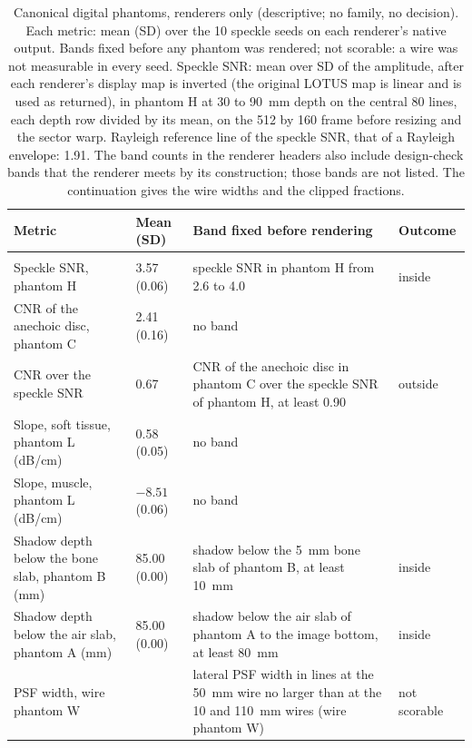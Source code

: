 
\begin{table}[tp]
\renewcommand{\baselinestretch}{1}\scriptsize
\caption{Canonical digital phantoms, renderers only (descriptive; no family, no decision). Each metric: mean (SD) over the 10 speckle seeds on each renderer's native output. Bands fixed before any phantom was rendered; not scorable: a wire was not measurable in every seed. Speckle SNR: mean over SD of the amplitude, after each renderer's display map is inverted (the original LOTUS map is linear and is used as returned), in phantom H at 30 to 90~mm depth on the central 80 lines, each depth row divided by its mean, on the 512 by 160 frame before resizing and the sector warp. Rayleigh reference line of the speckle SNR, that of a Rayleigh envelope: 1.91. The band counts in the renderer headers also include design-check bands that the renderer meets by its construction; those bands are not listed. The continuation gives the wire widths and the clipped fractions.}
\label{tab:phantoms}
\centering
\setlength{\tabcolsep}{3pt}
\begin{tabularx}{\textwidth}{@{}>{\raggedright\arraybackslash}p{} l >{\raggedright\arraybackslash}X l@{}}
\toprule
Metric & Mean (SD) & Band fixed before rendering & Outcome \\
\midrule
\multicolumn{4}{@{}l}{\textit{Physics renderer: meets 5 of 8 bands, 2 not scorable}} \\
\quad Speckle SNR, phantom H & 3.57 (0.06) & speckle SNR in phantom H from 2.6 to 4.0 & inside \\
\quad CNR of the anechoic disc, phantom C & 2.41 (0.16) & no band &  \\
\quad CNR over the speckle SNR & 0.67 & CNR of the anechoic disc in phantom C over the speckle SNR of phantom H, at least 0.90 & outside \\
\quad Slope, soft tissue, phantom L (dB/cm) & 0.58 (0.05) & no band &  \\
\quad Slope, muscle, phantom L (dB/cm) & $-8.51$ (0.06) & no band &  \\
\quad Shadow depth below the bone slab, phantom B (mm) & 85.00 (0.00) & shadow below the 5~mm bone slab of phantom B, at least 10~mm & inside \\
\quad Shadow depth below the air slab, phantom A (mm) & 85.00 (0.00) & shadow below the air slab of phantom A to the image bottom, at least 80~mm & inside \\
\quad PSF width, wire phantom W &  & lateral PSF width in lines at the 50~mm wire no larger than at the 10 and 110~mm wires (wire phantom W) & not scorable \\

\end{tabularx}
\end{table}
